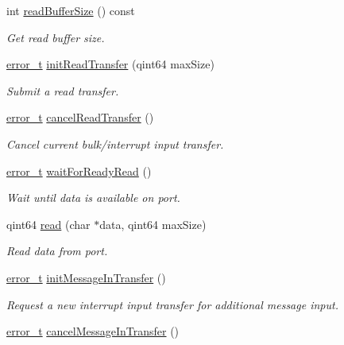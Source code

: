 \begin{DoxyCompactItemize}
int \hyperlink{classmdt_usb_port_af546a031ed8621fee1d5e9498cbcd174}{readBufferSize} () const 
\begin{DoxyCompactList}\small\item\em Get read buffer size. \end{DoxyCompactList}\item 
\hyperlink{classmdt_abstract_port_ad4121bb930c95887e77f8bafa065a85e}{error\_\-t} \hyperlink{classmdt_usb_port_a5e380852b8726f71e8558c86cba5bd1f}{initReadTransfer} (qint64 maxSize)
\begin{DoxyCompactList}\small\item\em Submit a read transfer. \end{DoxyCompactList}\item 
\hyperlink{classmdt_abstract_port_ad4121bb930c95887e77f8bafa065a85e}{error\_\-t} \hyperlink{classmdt_usb_port_a3570b708f9f51408e4bbf2f61cc8c881}{cancelReadTransfer} ()
\begin{DoxyCompactList}\small\item\em Cancel current bulk/interrupt input transfer. \end{DoxyCompactList}\item 
\hyperlink{classmdt_abstract_port_ad4121bb930c95887e77f8bafa065a85e}{error\_\-t} \hyperlink{classmdt_usb_port_ab8ddd4ebee603ac381e8da0383a61e36}{waitForReadyRead} ()
\begin{DoxyCompactList}\small\item\em Wait until data is available on port. \end{DoxyCompactList}\item 
qint64 \hyperlink{classmdt_usb_port_abce257345c8af47494215cd7ee75f82d}{read} (char $\ast$data, qint64 maxSize)
\begin{DoxyCompactList}\small\item\em Read data from port. \end{DoxyCompactList}\item 
\hyperlink{classmdt_abstract_port_ad4121bb930c95887e77f8bafa065a85e}{error\_\-t} \hyperlink{classmdt_usb_port_a897234cc2c7561da323cb124f57bcc28}{initMessageInTransfer} ()
\begin{DoxyCompactList}\small\item\em Request a new interrupt input transfer for additional message input. \end{DoxyCompactList}\item 
\hyperlink{classmdt_abstract_port_ad4121bb930c95887e77f8bafa065a85e}{error\_\-t} \hyperlink{classmdt_usb_port_afddcb02a1e2bd87609fd2b6305534560}{cancelMessageInTransfer} ()

\end{DoxyCompactItemize}

